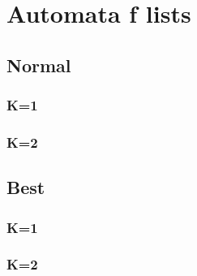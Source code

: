 
\twocolumn
\chapter{Automata f lists}
\label{chap:automataFlists}

% 
\section{Normal}
\subsection{K=1}
\label{sec:originalKone}
\scriptsize
\noindent

\subsection{K=2}
\label{sec:originalKtwo}
\noindent


\section{Best}
\subsection{K=1}
\label{sec:bestKone}
\scriptsize
\noindent

\subsection{K=2}
\label{sec:bestKtwo}
\noindent
\normalsize
\onecolumn
